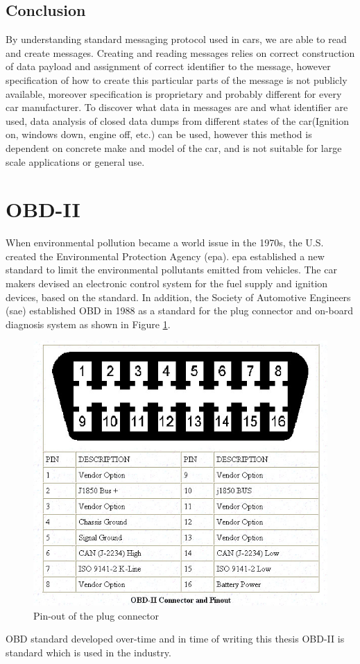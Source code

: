 \subsection{Conclusion} %
\label{sub:conclusion}
By understanding standard messaging protocol used in cars, we are able to read and create messages. Creating and reading messages relies on correct construction of data payload and assignment of correct identifier to the message, however specification of how to create this particular parts of the message is not publicly available, moreover specification is proprietary and probably different for every car manufacturer. To discover what data in messages are and what identifier are used, data analysis of closed data dumps from different states of the car(Ignition on, windows down, engine off, etc.) can be used, however this method is dependent on concrete make and model of the car, and is not suitable for large scale applications or general use.
\section{OBD-II}
When environmental pollution became a world issue in the 1970s, the U.S. created the Environmental Protection Agency (\gls{epa}). \gls{epa} established a new standard to limit the environmental pollutants emitted from vehicles. The car makers devised an electronic control system for the fuel supply and ignition devices, based on the standard. In addition, the Society of Automotive Engineers (\gls{sae}) established OBD in 1988 as a standard for the plug connector and on-board diagnosis system\cite{IJCSNS} as shown in Figure \ref{fig:obd_pinout}.
\begin{figure}[H]
\begin{center}
\captionsetup{font=small}
\includegraphics[scale=0.5]{pics/obd_pinout.jpg}
\caption{Pin-out of the plug connector}
\label{fig:obd_pinout}
\end{center}
\end{figure}
OBD standard developed over-time and in time of writing this thesis OBD-II is standard which is used in the industry.
